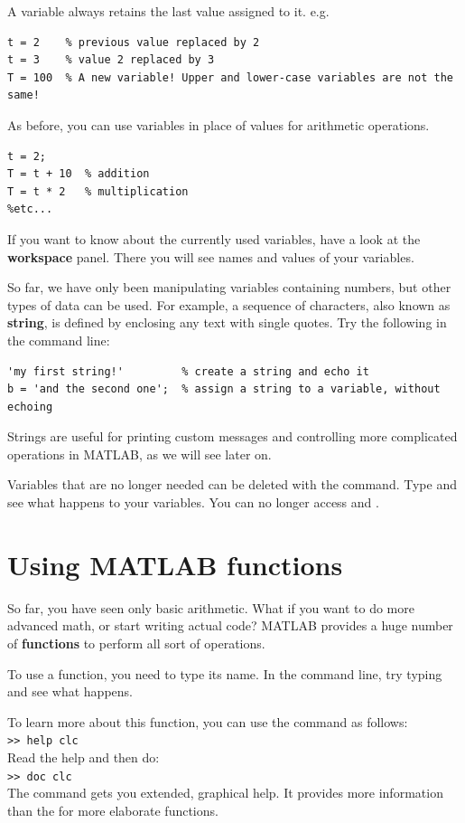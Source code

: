 \documentclass{article}
\begin{document}
A variable always retains the last value assigned to it. e.g.
\begin{lstlisting}
t = 2    % previous value replaced by 2
t = 3    % value 2 replaced by 3
T = 100  % A new variable! Upper and lower-case variables are not the same!
\end{lstlisting}

As before, you can use variables in place of values for arithmetic operations.
\begin{lstlisting}
t = 2;
T = t + 10  % addition
T = t * 2   % multiplication
%etc...
\end{lstlisting}

If you want to know about the currently used variables, have a look at the \textbf{workspace} panel.
There you will see names and values of your variables.

So far, we have only been manipulating variables containing numbers, but other types of data can be used.
For example, a sequence of characters, also known as \textbf{string}, is defined by enclosing any text with single quotes.
Try the following in the command line:
\begin{lstlisting}
'my first string!'         % create a string and echo it
b = 'and the second one';  % assign a string to a variable, without echoing
\end{lstlisting}
Strings are useful for printing custom messages and controlling more complicated operations in MATLAB, as we will see later on.

Variables that are no longer needed can be deleted with the  command.
Type  and see what happens to your variables. You can no longer access
 and .


\pagebreak
\section{Using MATLAB functions}

So far, you have seen only basic arithmetic.
What if you want to do more advanced math, or start writing actual code?
MATLAB provides a huge number of \textbf{functions} to perform all sort of operations.

To use a function, you need to type its name.
In the command line, try typing  and see what happens.

To learn more about this function, you can use the  command as follows:\\
\verb|>> help clc|\\
Read the help and then do:\\
\verb|>> doc clc|\\
The  command gets you extended, graphical help. It provides more information than the  for more elaborate functions.
\end{document}
